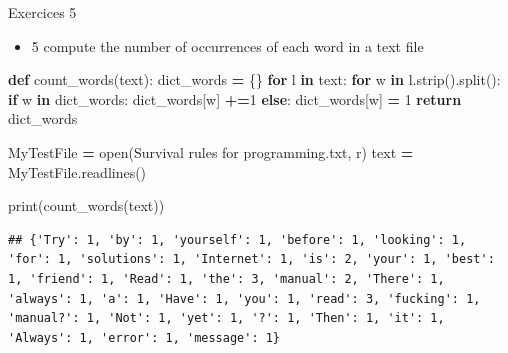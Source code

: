 \documentclass[
  8pt,
  ignorenonframetext,
]{beamer}
\newenvironment{Shaded}{\begin{snugshade}}{\end{snugshade}}
\newcommand{\BuiltInTok}[1]{#1}
\newcommand{\ControlFlowTok}[1]{\textcolor[rgb]{0.13,0.29,0.53}{\textbf{#1}}}
\newcommand{\DecValTok}[1]{\textcolor[rgb]{0.00,0.00,0.81}{#1}}
\newcommand{\KeywordTok}[1]{\textcolor[rgb]{0.13,0.29,0.53}{\textbf{#1}}}
\newcommand{\NormalTok}[1]{#1}
\newcommand{\OperatorTok}[1]{\textcolor[rgb]{0.81,0.36,0.00}{\textbf{#1}}}
\newcommand{\StringTok}[1]{\textcolor[rgb]{0.31,0.60,0.02}{#1}}
\providecommand{\tightlist}{%
  \setlength{\itemsep}{0pt}\setlength{\parskip}{0pt}}
\begin{document}
\begin{frame}[fragile]{Exercices 5}
\protect\hypertarget{exercices-5}{}
\begin{itemize}
\tightlist
\item
  5 compute the number of occurrences of each word in a text file
\end{itemize}

\begin{Shaded}
\begin{Highlighting}[]
\KeywordTok{def}\NormalTok{ count\_words(text):}
\NormalTok{  dict\_words }\OperatorTok{=}\NormalTok{ \{\}}
  \ControlFlowTok{for}\NormalTok{ l }\KeywordTok{in}\NormalTok{ text:}
    \ControlFlowTok{for}\NormalTok{ w }\KeywordTok{in}\NormalTok{ l.strip().split():}
      \ControlFlowTok{if}\NormalTok{ w }\KeywordTok{in}\NormalTok{ dict\_words:}
\NormalTok{        dict\_words[w] }\OperatorTok{+=}\DecValTok{1}
      \ControlFlowTok{else}\NormalTok{:}
\NormalTok{        dict\_words[w] }\OperatorTok{=} \DecValTok{1}
  \ControlFlowTok{return}\NormalTok{ dict\_words}


\NormalTok{MyTestFile }\OperatorTok{=} \BuiltInTok{open}\NormalTok{(}\StringTok{\textquotesingle{}Survival rules for programming.txt\textquotesingle{}}\NormalTok{, }\StringTok{\textquotesingle{}r\textquotesingle{}}\NormalTok{)}
\NormalTok{text }\OperatorTok{=}\NormalTok{ MyTestFile.readlines()}

\BuiltInTok{print}\NormalTok{(count\_words(text))}
\end{Highlighting}
\end{Shaded}

\begin{verbatim}
## {'Try': 1, 'by': 1, 'yourself': 1, 'before': 1, 'looking': 1, 'for': 1, 'solutions': 1, 'Internet': 1, 'is': 2, 'your': 1, 'best': 1, 'friend': 1, 'Read': 1, 'the': 3, 'manual': 2, 'There': 1, 'always': 1, 'a': 1, 'Have': 1, 'you': 1, 'read': 3, 'fucking': 1, 'manual?': 1, 'Not': 1, 'yet': 1, '?': 1, 'Then': 1, 'it': 1, 'Always': 1, 'error': 1, 'message': 1}
\end{verbatim}
\end{frame}
\end{document}
